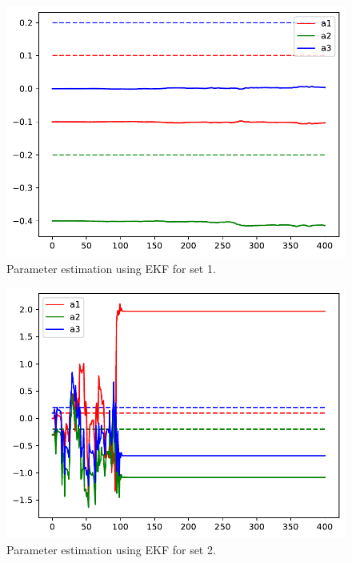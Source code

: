 \begin{figure}[H]
  \centering
  \includegraphics[scale=.4]{files/chinese_original.pdf}
  \caption{Parameter estimation using EKF for set 1.}
  \label{fig:orig}
\end{figure}

\begin{figure}[H]
  \centering
  \includegraphics[scale=.4]{files/chinese_estimation.pdf}
  \caption{Parameter estimation using EKF for set 2.}
  \label{fig:estimation}
\end{figure}

